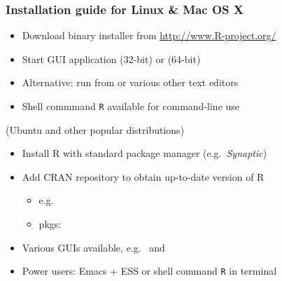 \documentclass[t]{beamer} %
\begin{document}
\begin{frame}
  \frametitle{Installation guide for Linux \& Mac OS X}

  \begin{itemize}
  \item Download binary installer from \url{http://www.R-project.org/}
  \item Start GUI application  (32-bit) or
     (64-bit)
  \item Alternative: run from  or various other text editors
  \item Shell commmand \texttt{R} available for command-line use
  \end{itemize}

  \gap
   (Ubuntu and other popular distributions)
  \begin{itemize}
  \item Install R with standard package manager (e.g.\ \emph{Synaptic})
  \item Add CRAN repository to obtain up-to-date version of R
    \begin{itemize}
    \item e.g.\ 
    \item pkgs: 
    \end{itemize}
  \item Various GUIs available, e.g.\  and 
  \item Power users: Emacs + ESS or shell command \texttt{R} in terminal
  \end{itemize}
\end{frame}
\end{document}
